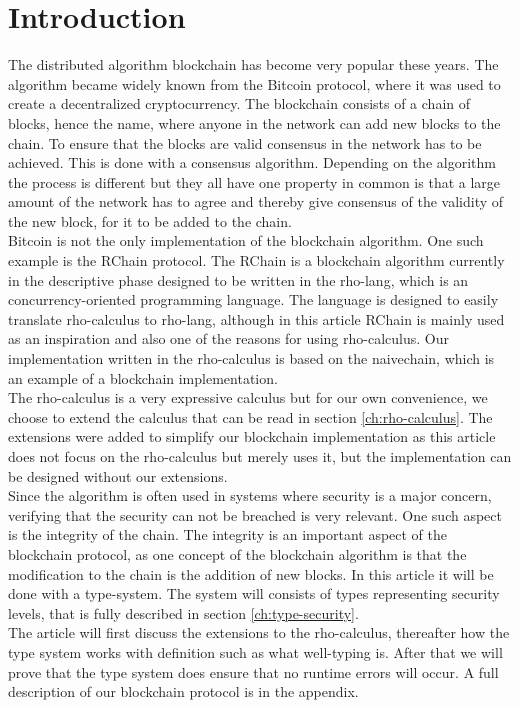 \section{Introduction}
The distributed algorithm blockchain has become very popular these years. The algorithm became widely known from the Bitcoin protocol, where it was used to create a decentralized cryptocurrency\citep{website:blockchain}. The blockchain consists of a chain of blocks, hence the name, where anyone in the network can add new blocks to the chain. To ensure that the blocks are valid consensus in the network has to be achieved. This is done with a consensus algorithm. Depending on the algorithm the process is different but they all have one property in common is that a large amount of the network has to agree and thereby give consensus of the validity of the new block, for it to be added to the chain.\\
Bitcoin is not the only implementation of the blockchain algorithm. One such example is the RChain protocol\citep{website:RChain}. The RChain is a blockchain algorithm currently in the descriptive phase designed to be written in the rho-lang, which is an concurrency-oriented programming language. The language is designed to easily translate rho-calculus to rho-lang\citep{website:rho-lang}, although in this article RChain is mainly used as an inspiration and also one of the reasons for using rho-calculus. Our implementation written in the rho-calculus is based on the naivechain, which is an example of a blockchain implementation\citep{naivechain}.\\

The rho-calculus is a very expressive calculus but for our own convenience, we choose to extend the calculus that can be read in section \ref{ch:rho-calculus}. The extensions were added to simplify our blockchain implementation as this article does not focus on the rho-calculus but merely uses it, but the implementation can be designed without our extensions.\\

Since the algorithm is often used in systems where security is a major concern, verifying that the security can not be breached is very relevant. One such aspect is the integrity of the chain.
The integrity is an important aspect of the blockchain protocol, as one concept of the blockchain algorithm is that the modification to the chain is the addition of new blocks. In this article it will be done with a type-system. The system will consists of types representing security levels, that is fully described in section \ref{ch:type-security}.\\

The article will first discuss the extensions to the rho-calculus, thereafter how the type system works with definition such as what well-typing is. After that we will prove that the type system does ensure that no runtime errors will occur. A full description of our blockchain protocol is in the appendix.
